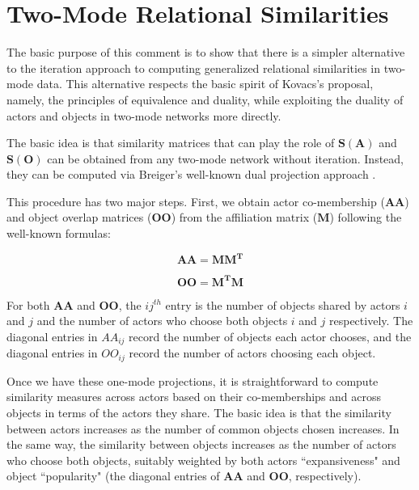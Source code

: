 \documentclass[a4paper,fleqn]{cas-sc}
\begin{document}
\section{Two-Mode Relational Similarities}
The basic purpose of this comment is to show that there is a simpler alternative to the iteration approach to computing generalized relational similarities in two-mode data. This alternative respects the basic spirit of Kovacs's proposal, namely, the principles of equivalence and duality, while exploiting the duality of actors and objects in two-mode networks more directly.

The basic idea is that similarity matrices that can play the role of $\mathbf{S(A)}$ and $\mathbf{S(O)}$ can be obtained from any two-mode network without iteration. Instead, they can be computed via Breiger's \citeyearpar{breiger1974} well-known dual projection approach \citep[see also ][]{everett2013}. 

This procedure has two major steps. First, we obtain actor co-membership ($\mathbf{AA}$) and object overlap matrices ($\mathbf{OO}$) from the affiliation matrix ($\mathbf{M}$) following the well-known formulas:

\begin{equation}
    \mathbf{AA} = \mathbf{MM^T}
    \label{eq:4}
\end{equation}


\begin{equation}
    \mathbf{OO} = \mathbf{M^TM}
    \label{eq:5}
\end{equation}

For both $\mathbf{AA}$ and $\mathbf{OO}$, the $ij^{th}$ entry is the number of objects shared by actors $i$ and $j$ and the number of actors who choose both objects $i$ and $j$ respectively. The diagonal entries in $AA_{ij}$ record the number of objects each actor chooses, and the diagonal entries in $OO_{ij}$ record the number of actors choosing each object. 

Once we have these one-mode projections, it is straightforward to compute similarity measures across actors based on their co-memberships and across objects in terms of the actors they share. The basic idea is that the similarity between actors increases as the number of common objects chosen increases. In the same way, the similarity between objects increases as the number of actors who choose both objects, suitably weighted by both actors ``expansiveness" and object ``popularity" (the diagonal entries of $\mathbf{AA}$ and $\mathbf{OO}$, respectively). 
\end{document}

